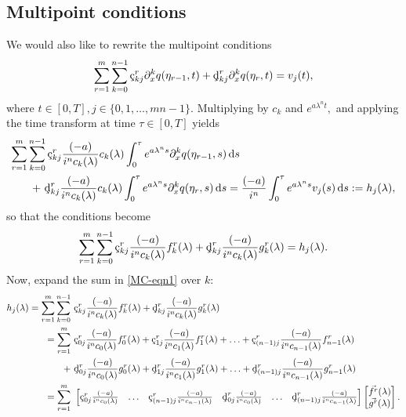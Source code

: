 \documentclass[10pt,reqno,oneside,a4paper]{article}
\begin{document}
\subsection{Multipoint conditions}
We would also like to rewrite the multipoint conditions
\begin{equation*}
\sum^{m}_{r=1} \sum^{n-1}_{k=0} \textup{\c{c}}_{k j}^r  \partial_x^{k} q(\eta_{r-1}, t) + \textup{\c{d}}_{kj}^r  \partial_x^{k} q(\eta_{r}, t) = v_j(t),
\end{equation*}
where $t \in [0,T], j \in \{ 0, 1, \ldots, mn-1\}.$  Multiplying by  $c_k$ and $e^{a\lambda^n t},$ and applying the time transform at time $\tau \in [0,T]$ yields
\begin{equation*}
\begin{aligned}
\sum^{m}_{r=1} \sum^{n-1}_{k=0} \textup{\c{c}}_{k j}^r  \frac{(-a)}{i^n c_k(\lambda)} c_k(\lambda) \int^\tau_0 e^{a \lambda^n s} \partial_x^{k} q(\eta_{r-1}, s) &\D s  \\
+ ~ \textup{\c{d}}_{kj}^r  \frac{(-a)}{i^n c_k(\lambda)}c_k(\lambda) \int^\tau_0 e^{a \lambda^n s} \partial_x^{k} q(\eta_{r}, s) \D s &=  \frac{(-a)}{i^n}\int^\tau_0 e^{a \lambda^n s} v_j(s) \D s := h_j(\lambda),
\end{aligned}
\end{equation*}
so that the conditions become 
\begin{equation}\label{MC-eqn1}
\begin{aligned}
\sum^{m}_{r=1} \sum^{n-1}_{k=0} \textup{\c{c}}_{k j}^r  \frac{(-a)}{i^n c_k(\lambda)} f^r_k(\lambda) +  \textup{\c{d}}_{kj}^r  \frac{(-a)}{i^n c_k(\lambda)} g^r_k(\lambda) = h_j(\lambda).
\end{aligned}
\end{equation}
Now, expand the sum in \eqref{MC-eqn1} over $k:$
\begin{align}
h_j(\lambda)= \sum^{m}_{r=1} \sum^{n-1}_{k=0} ~&\textup{\c{c}}_{k j}^r  \frac{(-a)}{i^n c_k(\lambda)} f^r_k(\lambda) + \textup{\c{d}}_{kj}^r  \frac{(-a)}{i^n c_k(\lambda)} g^r_k(\lambda) \nonumber \\
= \sum^{m}_{r=1} ~&\textup{\c{c}}_{0 j}^r  \frac{(-a)}{i^n c_0(\lambda)} f^r_0(\lambda) + \textup{\c{c}}_{1 j}^r  \frac{(-a)}{i^n c_1(\lambda)} f^r_1(\lambda)  + \ldots + \textup{\c{c}}_{(n-1) j}^r  \frac{(-a)}{i^n c_{n-1}(\lambda)} f^r_{n-1}(\lambda) \nonumber \\
+ ~&\textup{\c{d}}_{0j}^r  \frac{(-a)}{i^n c_0(\lambda)} g^r_0(\lambda) +\textup{\c{d}}_{1j}^r  \frac{(-a)}{i^n c_1(\lambda)} g^r_1(\lambda) +\ldots + \textup{\c{d}}_{(n-1)j}^r  \frac{(-a)}{i^n c_{n-1}(\lambda)} g^r_{n-1}(\lambda) \nonumber \\
= \sum^{m}_{r=1} ~&\begin{bmatrix} \textup{\c{c}}_{0 j}^r  \frac{(-a)}{i^n c_0(\lambda)} & \ldots & \textup{\c{c}}_{(n-1) j}^r  \frac{(-a)}{i^n c_{n-1}(\lambda)}  & \textup{\c{d}}_{0j}^r  \frac{(-a)}{i^n c_0(\lambda)} & \ldots & \textup{\c{d}}_{(n-1)j}^r  \frac{(-a)}{i^n c_{n-1}(\lambda)} \end{bmatrix} \begin{bmatrix}  \vec{f^r}(\lambda) \\ \vec{g^r}(\lambda) \end{bmatrix}. \label{MC-eqn2}
\end{align}
\end{document}
